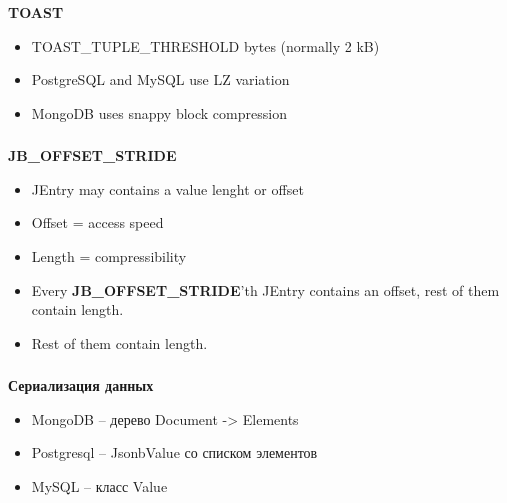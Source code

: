 \documentclass[usenames,dvipsnames, 18pt, compress, aspectratio=169]{beamer}
\begin{document}
\begin{frame}
    \frametitle{}
    \begin{center}
    \textbf{TOAST}
    \vspace{20pt}


    \vspace{20pt}
    \begin{itemize}[label={\MVRightarrow}]
        \item TOAST\_TUPLE\_THRESHOLD bytes (normally 2 kB)
        \item PostgreSQL and MySQL use LZ variation
        \item MongoDB uses snappy block compression
    \end{itemize}

    \end{center}
\end{frame}

\begin{frame}
    \frametitle{}
    \begin{center}
    \textbf{JB\_OFFSET\_STRIDE}

    \begin{itemize}[label={\MVRightarrow}]
        \item JEntry may contains a value lenght or offset
        \item Offset = access speed
        \item Length = compressibility
        \item Every \textbf{JB\_OFFSET\_STRIDE}'th JEntry contains an offset, rest of them contain length.
        \item Rest of them contain length.
    \end{itemize}
    \end{center}
\end{frame}

\begin{frame}
    \frametitle{}
    \textbf{Сериализация данных}
    \begin{center}
        \begin{itemize}[label={\MVRightarrow}]
            \item MongoDB -- дерево Document -> Elements
            \item Postgresql -- JsonbValue со списком элементов
            \item MySQL -- класс Value
        \end{itemize}
    \end{center}
\end{frame}
\end{document}
